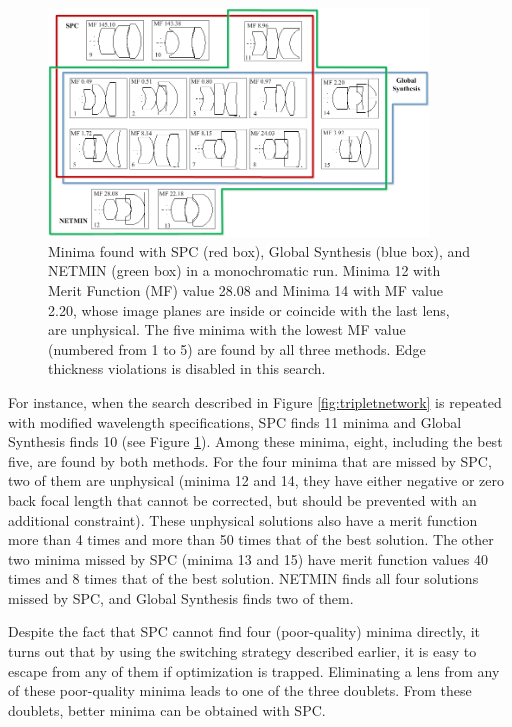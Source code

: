 \begin{figure}[h]
    \centering
    \setlength{\belowcaptionskip}{-10pt}
    \includegraphics[width=0.9\textwidth]{chapter-3/figures/TripletMoNoNetwork.png}
    \caption{Minima found with SPC (red box), Global Synthesis (blue box), and NETMIN (green box) in a monochromatic run. Minima 12 with Merit Function (MF) value 28.08 and Minima 14 with MF value 2.20, whose image planes are inside or coincide with the last lens, are unphysical. The five minima with the lowest MF value (numbered from 1 to 5) are found by all three methods. Edge thickness violations is disabled in this search.}
    \label{fig:TripletMonoNetwork}
\end{figure}

For instance, when the search described in Figure \ref{fig:tripletnetwork} is repeated with modified wavelength specifications, SPC finds 11 minima and Global Synthesis finds 10 (see Figure \ref{fig:TripletMonoNetwork}). Among these minima, eight, including the best five, are found by both methods. For the four minima that are missed by SPC, two of them are unphysical (minima 12 and 14, they have either negative or zero back focal length that cannot be corrected, but should be prevented with an additional constraint). These unphysical solutions also have a merit function more than 4 times and more than 50 times that of the best solution. The other two minima missed by SPC (minima 13 and 15) have merit function values 40 times and 8 times that of the best solution. NETMIN finds all four solutions missed by SPC, and Global Synthesis finds two of them.

Despite the fact that SPC cannot find four (poor-quality) minima directly, it turns out that by using the switching strategy described earlier, it is easy to escape from any of them if optimization is trapped. Eliminating a lens from any of these poor-quality minima leads to one of the three doublets. From these doublets, better minima can be obtained with SPC.

